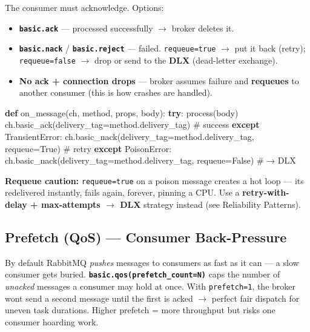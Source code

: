 \documentclass[11pt]{article}
\providecommand{\tightlist}{\setlength{\itemsep}{1pt}\setlength{\parskip}{0pt}}
\newenvironment{Shaded}{\begin{snugshade}}{\end{snugshade}}
\newcommand{\CommentTok}[1]{\textcolor[rgb]{0.48,0.49,0.49}{#1}}
\newcommand{\ControlFlowTok}[1]{\textcolor[rgb]{0.99,0.74,0.29}{\textbf{#1}}}
\newcommand{\KeywordTok}[1]{\textcolor[rgb]{0.81,0.81,0.76}{\textbf{#1}}}
\newcommand{\NormalTok}[1]{\textcolor[rgb]{0.81,0.81,0.76}{#1}}
\newcommand{\OperatorTok}[1]{\textcolor[rgb]{0.81,0.81,0.76}{#1}}
\newcommand{\VariableTok}[1]{\textcolor[rgb]{0.15,0.68,0.68}{#1}}
\begin{document}
The consumer must acknowledge. Options:

\begin{itemize}
\tightlist
\item
  \textbf{\texttt{basic.ack}} --- processed successfully \(\rightarrow\) broker deletes it.
\item
  \textbf{\texttt{basic.nack}} / \textbf{\texttt{basic.reject}} --- failed. \texttt{requeue=true} \(\rightarrow\) put it back (retry); \texttt{requeue=false} \(\rightarrow\) drop or send to the \textbf{DLX} (dead-letter exchange).
\item
  \textbf{No ack + connection drops} --- broker assumes failure and \textbf{requeues} to another consumer (this is how crashes are handled).
\end{itemize}


\begin{Shaded}
\begin{Highlighting}[]
\KeywordTok{def}\NormalTok{ on\_message(ch, method, props, body):}
    \ControlFlowTok{try}\NormalTok{:}
\NormalTok{        process(body)}
\NormalTok{        ch.basic\_ack(delivery\_tag}\OperatorTok{=}\NormalTok{method.delivery\_tag)        }\CommentTok{\# success}
    \ControlFlowTok{except}\NormalTok{ TransientError:}
\NormalTok{        ch.basic\_nack(delivery\_tag}\OperatorTok{=}\NormalTok{method.delivery\_tag, requeue}\OperatorTok{=}\VariableTok{True}\NormalTok{)   }\CommentTok{\# retry}
    \ControlFlowTok{except}\NormalTok{ PoisonError:}
\NormalTok{        ch.basic\_nack(delivery\_tag}\OperatorTok{=}\NormalTok{method.delivery\_tag, requeue}\OperatorTok{=}\VariableTok{False}\NormalTok{)  }\CommentTok{\# → DLX}
\end{Highlighting}
\end{Shaded}

\textbf{Requeue caution:} \texttt{requeue=true} on a poison message creates a hot loop --- it\textquotesingle s redelivered instantly, fails again, forever, pinning a CPU. Use a \textbf{retry-with-delay + max-attempts \(\rightarrow\) DLX} strategy instead (see Reliability Patterns).

\subsection{Prefetch (QoS) --- Consumer Back-Pressure}\label{prefetch-qos--consumer-back-pressure}

By default RabbitMQ \emph{pushes} messages to consumers as fast as it can --- a slow consumer gets buried. \textbf{\texttt{basic.qos(prefetch\_count=N)}} caps the number of \emph{unacked} messages a consumer may hold at once. With \texttt{prefetch=1}, the broker won\textquotesingle t send a second message until the first is acked \(\rightarrow\) perfect fair dispatch for uneven task durations. Higher prefetch = more throughput but risks one consumer hoarding work.
\end{document}
